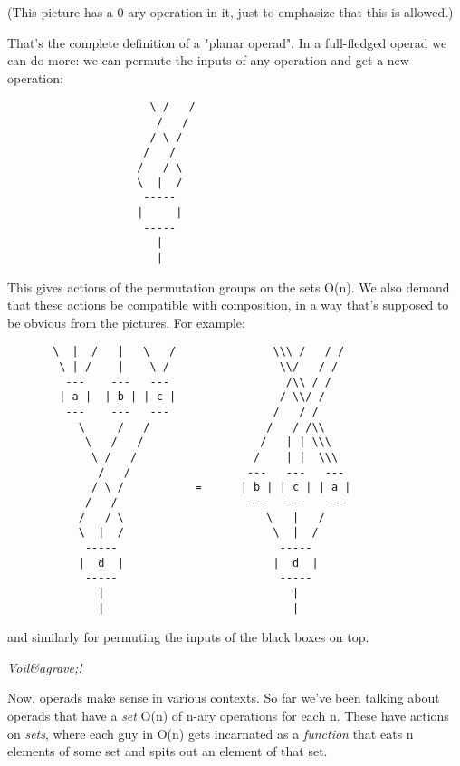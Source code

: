 (This picture has a 0-ary operation in it, just to emphasize
that this is allowed.)  

That's the complete definition of a "planar operad".  In a 
full-fledged operad we can do more: we can permute the inputs 
of any operation and get a new operation:
                      
\begin{verbatim}
                      \ /   /
                       /   /
                      / \ /    
                     /   /   
                    /   / \
                    \  |  /
                     -----
                    |     | 
                     -----
                       |
                       |
\end{verbatim}
    
This gives actions of the permutation groups on the sets O(n).  
We also demand that these actions be compatible with composition, 
in a way that's supposed to be obvious from the pictures.   For 
example:


\begin{verbatim}
       \  |  /   |   \   /               \\\ /   / /
        \ | /    |    \ /                 \\/   / /
         ---    ---   ---                  /\\ / /
        | a |  | b | | c |                / \\/ /
         ---    ---   ---                /   / /
           \     /   /                  /   / /\\
            \   /   /                  /   | | \\\  
             \ /   /                  /    | |  \\\
              /   /                  ---   ---   ---
             / \ /           =      | b | | c | | a |
            /   /                    ---   ---   ---
           /   / \                      \   |   /
           \  |  /                       \  |  /
            -----                         -----
           |  d  |                       |  d  | 
            -----                         -----
              |                             |
              |                             |
\end{verbatim}
    
and similarly for permuting the inputs of the black boxes on
top.

\emph{Voil&agrave;!}

Now, operads make sense in various contexts.  So far we've been 
talking about operads that have a \emph{set} O(n) of n-ary operations 
for each n.  These have actions on \emph{sets}, where each guy in O(n) 
gets incarnated as a \emph{function} that eats n elements of some set 
and spits out an element of that set. 

